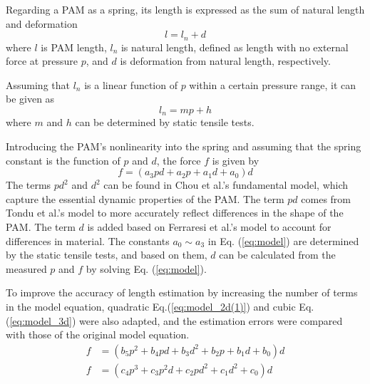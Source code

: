 Regarding a PAM as a spring\cite{spring}, its length is expressed as the sum of natural length and deformation
\begin{equation}
   l = l_n + d
\label{eq:estimation}
\end{equation}
where $l$ is PAM length, $l_n$ is natural length, defined as length with no external force at pressure $p$, and $d$ is deformation from natural length, respectively.
 
Assuming that $l_n$ is a linear function of $p$ within a certain pressure range, it can be given as
\begin{equation}
l_n = mp + h
\label{eq:L_n}
\end{equation}
where $m$ and $h$ can be determined by static tensile tests.
 
Introducing the PAM's nonlinearity into the spring and assuming that the spring constant is the function of $p$ and $d$, the force $f$ is given by
\begin{equation}
\label{eq:model}
f = (a_3pd + a_2p + a_1d + a_0)d
\end{equation}
The terms $pd^2$ and $d^2$ can be found in Chou et al.'s fundamental model\cite{chouMeasurementModelingMcKibben1996}, which capture the essential dynamic properties of the PAM. The term $pd$  comes from Tondu et al.'s model\cite{ModelingControl} to more accurately reflect differences in the shape of the PAM. The term $d$ is added based on Ferraresi et al.'s model\cite{Comparison} to account for differences in material. The constants $a_0 \sim a_3$ in Eq. (\ref{eq:model}) are determined by the static tensile tests, and based on them, $d$  can be calculated from the measured $p$ and $f$ by solving Eq. (\ref{eq:model}).

To improve the accuracy of length estimation by increasing the number of terms in the model equation, quadratic Eq.(\ref{eq:model_2d(1)}) and cubic Eq. (\ref{eq:model_3d}) were also adapted, and the estimation errors were compared with those of the original model equation.
\begin{align}
   f &= (b_5p^2 + b_4pd + b_3d^2 + b_2p+b_1d+b_0)d \label{eq:model_2d(1)} \\
   f &= (c_4p^3+c_3p^2d+c_2pd^2+c_1d^2+c_0)d \label{eq:model_3d}
\end{align}

